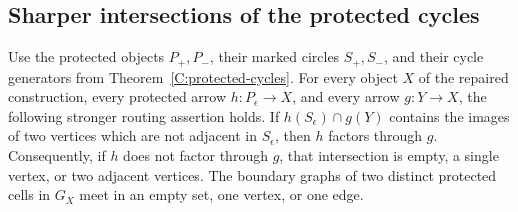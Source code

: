 \subsection{Sharper intersections of the protected cycles}

\begin{proposition}
\label{C:protected-nonadjacent}
Use the protected objects $P_+,P_-$, their marked circles $S_+,S_-$,
and their cycle generators from Theorem~\ref{C:protected-cycles}.
For every object $X$ of the repaired construction, every protected
arrow $h:P_\epsilon\to X$, and every arrow $g:Y\to X$, the following
stronger routing assertion holds. If $h(S_\epsilon)\cap g(Y)$ contains
the images of two vertices which are not adjacent in $S_\epsilon$,
then $h$ factors through $g$. Consequently, if $h$ does not factor
through $g$, that intersection is empty, a single vertex, or two
adjacent vertices. The boundary graphs of two distinct protected cells
in $G_X$ meet in an empty set, one vertex, or one edge.
\end{proposition}

